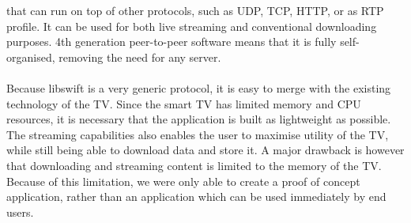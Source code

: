 that can run on top of other protocols, such as UDP, TCP, HTTP, or as RTP profile.
It can be used for both live streaming and conventional downloading purposes.
4th generation peer-to-peer software means that it is fully self-organised, removing the need for any server.\cite{4g}
\\\\
Because libswift is a very generic protocol, it is easy to merge with the existing technology of the TV.
Since the smart TV has limited memory and CPU resources,
it is necessary that the application is built as lightweight as possible.
The streaming capabilities also enables the user to maximise utility of the TV,
while still being able to download data and store it.
A major drawback is however that downloading and streaming content is limited to the memory of the TV.
Because of this limitation, we were only able to create a proof of concept application, rather than an application which can be used immediately
by end users.
